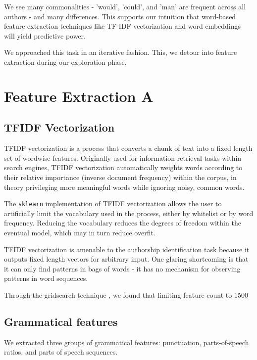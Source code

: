 \documentclass[12pt]{article}
\begin{document}
We see many commonalities - 'would', 'could', and 'man' are frequent across all authors - and many differences. This supports our intuition that word-based feature extraction techniques like TF-IDF vectorization and word embeddings will yield predictive power.

We approached this task in an iterative fashion. This, we detour into feature extraction during our exploration phase.

\section{Feature Extraction A}

\subsection{TFIDF Vectorization}
TFIDF vectorization is a process that converts a chunk of text into
a fixed length set of wordwise features. Originally used for information retrieval tasks within search engines, TFIDF vectorization automatically weights words according to their relative importance (inverse document frequency) within the corpus, in theory privileging more meaningful words while ignoring noisy, common words.

The \texttt{sklearn} implementation of TFIDF vectorization allows the user to artificially limit the vocabulary used in the process, either by whitelist or by word frequency. Reducing the vocabulary reduces the degrees of freedom within the eventual model, which may in turn reduce overfit.

TFIDF vectorization is amenable to the authorship identification task because it outputs fixed length vectors for arbitrary input. One glaring shortcoming is that it can only find patterns in bags of words - it has no mechanism for observing patterns in word sequences.

Through the gridsearch technique , we found that limiting feature count to 1500

\subsection{Grammatical features}
We extracted three groups of grammatical features: punctuation, parts-of-speech ratios, and parts of speech sequences.
\end{document}

